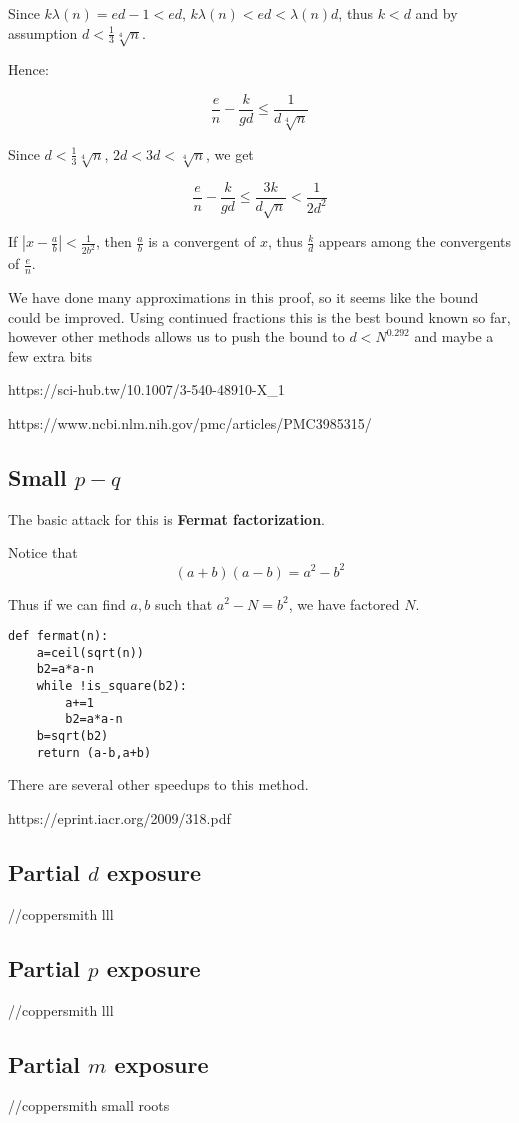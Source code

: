 \documentclass{report}
\begin{document}
Since $k \lambda(n)=ed-1<ed$, $k \lambda(n)<ed<\lambda(n)d$, thus $k<d$ and by assumption $d<\frac{1}{3}\sqrt[4]{n}$.

Hence:

$$\frac{e}{n}-\frac{k}{gd}\le\frac{1}{d\sqrt[4]{n}}$$

Since $d<\frac{1}{3}\sqrt[4]{n}$, $2d<3d<\sqrt[4]{n}$, we get

$$\frac{e}{n}-\frac{k}{gd}\le\frac{3k}{d\sqrt{n}}<\frac{1}{2d^2}$$

If $ \left\vert x-\frac{a}{b} \right\vert<\frac{1}{2b^2}$, then $\frac{a}{b}$ is a convergent of $x$, thus $\frac{k}{d}$ appears among the convergents of $\frac{e}{n}$.

We have done many approximations in this proof, so it seems like the bound could be improved. Using continued fractions this is the best bound known so far, however other methods allows us to push the bound to $d<N^{0.292}$ and maybe a few extra bits

https://sci-hub.tw/10.1007/3-540-48910-X\_1

https://www.ncbi.nlm.nih.gov/pmc/articles/PMC3985315/


\subsection{Small $p-q$}
The basic attack for this is \textbf{Fermat factorization}.

Notice that $$(a+b)(a-b)=a^2-b^2$$

Thus if we can find $a,b$ such that $a^2-N=b^2$, we have factored $N$. 

\begin{lstlisting}
def fermat(n):
	a=ceil(sqrt(n))
	b2=a*a-n
	while !is_square(b2):
		a+=1
		b2=a*a-n
	b=sqrt(b2)
	return (a-b,a+b)
\end{lstlisting}

There are several other speedups to this method.

https://eprint.iacr.org/2009/318.pdf
\subsection{Partial $d$ exposure}
//coppersmith lll
\subsection{Partial $p$ exposure}
//coppersmith lll
\subsection{Partial $m$ exposure}
//coppersmith small roots
\end{document}
